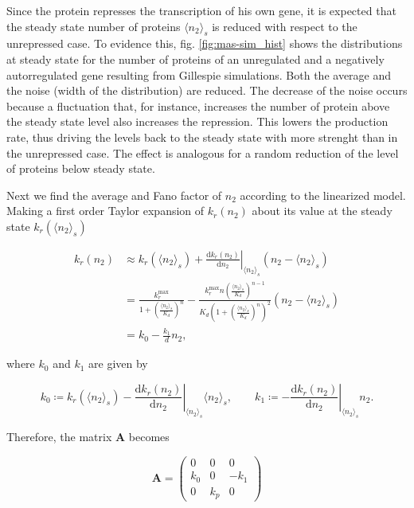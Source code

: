 Since the protein represses the transcription of his own gene, it is expected that the steady state number of proteins $\langle n_2\rangle_s$ is reduced with respect to the unrepressed case. To evidence this, fig. \ref{fig:mas-sim_hist} shows the distributions at steady state for the number of proteins of an unregulated and a negatively autorregulated gene resulting from Gillespie simulations. Both the average and the noise (width of the distribution) are reduced. The decrease of the noise occurs because a fluctuation that, for instance, increases the number of protein above the steady state level also increases the repression. This lowers the production rate, thus driving the levels back to the steady state with more strenght than in the unrepressed case. The effect is analogous for a random reduction of the level of proteins below steady state.


Next we find the average and Fano factor of $n_2$ according to the linearized model. Making a first order Taylor expansion of $k_r(n_2)$ about its value at the steady state $k_r(\langle n_2\rangle_s)$

\begin{equation}
  \begin{split}
  k_r(n_2) &\approx k_r(\langle n_2\rangle_s) + \left.\frac{\mathrm{d}k_r(n_2)}{\mathrm{d}n_2}\right|_{\langle n_2\rangle_s}\left(n_2-\langle n_2\rangle_s\right)\\
  &=\frac{k_r^{\text{max}}}{1+\left(\frac{\langle n_2\rangle_s}{K_d}\right)^n} - \frac{k_r^{\text{max}}n\left(\frac{\langle n_2\rangle_s}{K_d}\right)^{n-1}}{K_d\left(1+\left(\frac{\langle n_2\rangle_s}{K_d}\right)^n\right)^2}\left(n_2-\langle n_2\rangle_s\right)\\
  &= k_0-\frac{k_1}{d}n_2,
  \end{split}
\end{equation} 

where $k_0$ and $k_1$ are given by

\begin{equation*}
  k_0\coloneqq k_r(\langle n_2\rangle_s) - \left.\frac{\mathrm{d}k_r(n_2)}{\mathrm{d}n_2}\right|_{\langle n_2\rangle_s}\langle n_2\rangle_s,\quad\quad k_1 \coloneqq -\left.\frac{\mathrm{d}k_r(n_2)}{\mathrm{d}n_2}\right|_{\langle n_2\rangle_s}n_2. 
\end{equation*}

Therefore, the matrix $\mathbf{A}$ becomes

\begin{equation*}
  \mathbf{A} =
  \begin{pmatrix}
    0 & 0 & 0 \\
    k_0 & 0 & -k_1 \\
    0 & k_p & 0
  \end{pmatrix}
\end{equation*}

